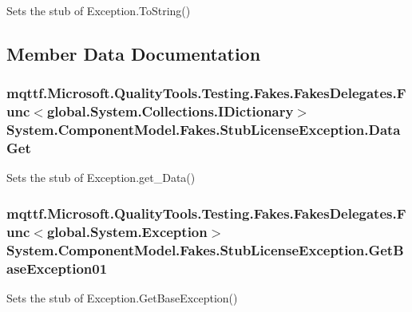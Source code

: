 Sets the stub of Exception.\-To\-String()



\subsection{Member Data Documentation}
\hypertarget{class_system_1_1_component_model_1_1_fakes_1_1_stub_license_exception_aedba5bd1157cfb8c1e17421e21b564e7}{
\subsubsection[{Data\-Get}]{\setlength{\rightskip}{0pt plus 5cm}mqttf.\-Microsoft.\-Quality\-Tools.\-Testing.\-Fakes.\-Fakes\-Delegates.\-Func$<$global.\-System.\-Collections.\-I\-Dictionary$>$ System.\-Component\-Model.\-Fakes.\-Stub\-License\-Exception.\-Data\-Get}}\label{class_system_1_1_component_model_1_1_fakes_1_1_stub_license_exception_aedba5bd1157cfb8c1e17421e21b564e7}


Sets the stub of Exception.\-get\-\_\-\-Data()

\hypertarget{class_system_1_1_component_model_1_1_fakes_1_1_stub_license_exception_a99402ca8aa002b8ee2ae2bb9e5539680}{
\subsubsection[{Get\-Base\-Exception01}]{\setlength{\rightskip}{0pt plus 5cm}mqttf.\-Microsoft.\-Quality\-Tools.\-Testing.\-Fakes.\-Fakes\-Delegates.\-Func$<$global.\-System.\-Exception$>$ System.\-Component\-Model.\-Fakes.\-Stub\-License\-Exception.\-Get\-Base\-Exception01}}\label{class_system_1_1_component_model_1_1_fakes_1_1_stub_license_exception_a99402ca8aa002b8ee2ae2bb9e5539680}


Sets the stub of Exception.\-Get\-Base\-Exception()

